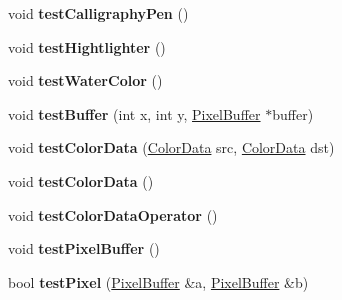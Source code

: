 \begin{DoxyCompactItemize}
\item 
\hypertarget{classInteractiveToolTest_aac810d8a16055ffd78a0e42373f2fdfb}{void {\bfseries test\-Calligraphy\-Pen} ()}\label{classInteractiveToolTest_aac810d8a16055ffd78a0e42373f2fdfb}

\item 
\hypertarget{classInteractiveToolTest_ad8a3b7115831b0ce1336cf8b7a3a2331}{void {\bfseries test\-Hightlighter} ()}\label{classInteractiveToolTest_ad8a3b7115831b0ce1336cf8b7a3a2331}

\item 
\hypertarget{classInteractiveToolTest_a0ff00a1626d01d07e908b83e29e9d89a}{void {\bfseries test\-Water\-Color} ()}\label{classInteractiveToolTest_a0ff00a1626d01d07e908b83e29e9d89a}

\item 
\hypertarget{classInteractiveToolTest_af97dc645abc7cf91dcaeddee79fa42cd}{void {\bfseries test\-Buffer} (int x, int y, \hyperlink{classPixelBuffer}{Pixel\-Buffer} $\ast$buffer)}\label{classInteractiveToolTest_af97dc645abc7cf91dcaeddee79fa42cd}

\item 
\hypertarget{classInteractiveToolTest_accc703ccf72ac1a0efc2143aa8298d35}{void {\bfseries test\-Color\-Data} (\hyperlink{classColorData}{Color\-Data} src, \hyperlink{classColorData}{Color\-Data} dst)}\label{classInteractiveToolTest_accc703ccf72ac1a0efc2143aa8298d35}

\item 
\hypertarget{classInteractiveToolTest_a6dff29ef3486bb63d6a2ce22189e57ce}{void {\bfseries test\-Color\-Data} ()}\label{classInteractiveToolTest_a6dff29ef3486bb63d6a2ce22189e57ce}

\item 
\hypertarget{classInteractiveToolTest_a5a6a4d2c88b1a79b1b653fd9869ecc83}{void {\bfseries test\-Color\-Data\-Operator} ()}\label{classInteractiveToolTest_a5a6a4d2c88b1a79b1b653fd9869ecc83}

\item 
\hypertarget{classInteractiveToolTest_a82bde8fa219b044707feefdead166049}{void {\bfseries test\-Pixel\-Buffer} ()}\label{classInteractiveToolTest_a82bde8fa219b044707feefdead166049}

\item 
\hypertarget{classInteractiveToolTest_a7352c0b2109d7ec0bc20e611f9af389d}{bool {\bfseries test\-Pixel} (\hyperlink{classPixelBuffer}{Pixel\-Buffer} \&a, \hyperlink{classPixelBuffer}{Pixel\-Buffer} \&b)}\label{classInteractiveToolTest_a7352c0b2109d7ec0bc20e611f9af389d}

\end{DoxyCompactItemize}
